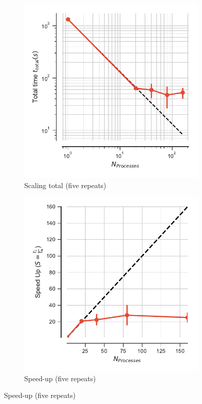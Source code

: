 \begin{figure}[ht!]
\centering
\begin{subfigure}{.4\textwidth}
  \includegraphics[width=\linewidth]{figures/main-RMSD-t_total-SuperMIC.pdf}
  \caption{Scaling total (five repeats)}
  \label{fig:MPIscaling-SuperMIC}
\end{subfigure}
\hfill
\begin{subfigure}{.4\textwidth}
  \includegraphics[width=\linewidth]{figures/main-RMSD-speed_up-SuperMIC.pdf}
  \caption{Speed-up (five repeats)}
  \label{fig:MPIspeedup-SuperMIC}
\end{subfigure}
\bigskip


\end{figure}
